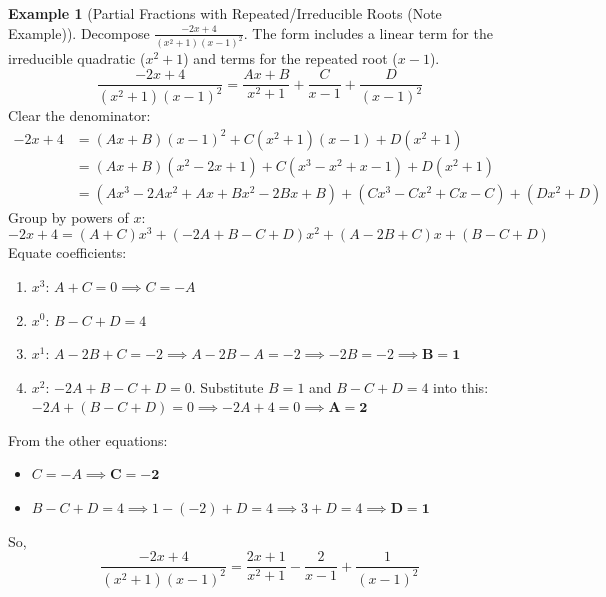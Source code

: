 \documentclass[11pt, a4paper]{article}
\theoremstyle{definition}
\newtheorem{example}[theorem]{Example}
\begin{document}
\begin{example}[Partial Fractions with Repeated/Irreducible Roots (Note Example)]
Decompose $\frac{-2x+4}{(x^2+1)(x-1)^2}$.
The form includes a linear term for the irreducible quadratic ($x^2+1$) and terms for the repeated root ($x-1$).
\[
\frac{-2x+4}{(x^2+1)(x-1)^2} = \frac{Ax+B}{x^2+1} + \frac{C}{x-1} + \frac{D}{(x-1)^2}
\]
Clear the denominator:
\begin{align*}
-2x+4 &= (Ax+B)(x-1)^2 + C(x^2+1)(x-1) + D(x^2+1) \\
&= (Ax+B)(x^2-2x+1) + C(x^3-x^2+x-1) + D(x^2+1) \\
&= (Ax^3 - 2Ax^2 + Ax + Bx^2 - 2Bx + B) + (Cx^3 - Cx^2 + Cx - C) + (Dx^2 + D)
\end{align*}
Group by powers of $x$:
\[
-2x+4 = (A+C)x^3 + (-2A+B-C+D)x^2 + (A-2B+C)x + (B-C+D)
\]
Equate coefficients:
\begin{enumerate}
    \item $x^3$: $A+C = 0 \implies C = -A$
    \item $x^0$: $B-C+D = 4$
    \item $x^1$: $A-2B+C = -2 \implies A-2B-A = -2 \implies -2B = -2 \implies \mathbf{B=1}$
    \item $x^2$: $-2A+B-C+D = 0$. Substitute $B=1$ and $B-C+D=4$ into this: \\ $-2A+(B-C+D) = 0 \implies -2A + 4 = 0 \implies \mathbf{A=2}$
\end{enumerate}
From the other equations:
\begin{itemize}
    \item $C = -A \implies \mathbf{C=-2}$
    \item $B-C+D = 4 \implies 1 - (-2) + D = 4 \implies 3 + D = 4 \implies \mathbf{D=1}$
\end{itemize}
So,
\[
\frac{-2x+4}{(x^2+1)(x-1)^2} = \frac{2x+1}{x^2+1} - \frac{2}{x-1} + \frac{1}{(x-1)^2}
\]
\end{example}
\end{document}

